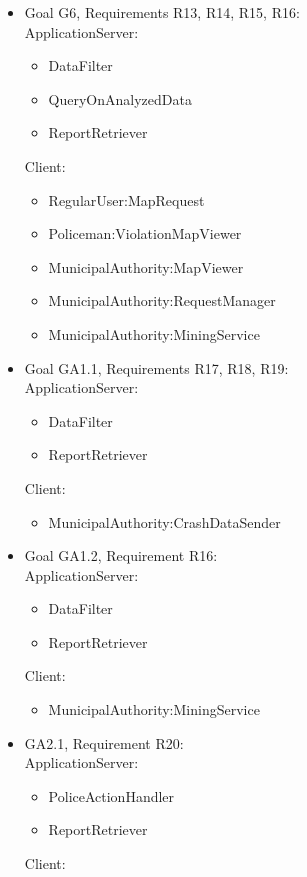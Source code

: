 \begin{itemize}
\begin{itemize}
	\end{itemize}
	\item Goal G6, Requirements R13, R14, R15, R16:\\ApplicationServer:
	\begin{itemize}
		\item DataFilter
		\item QueryOnAnalyzedData
		\item ReportRetriever
	\end{itemize}
	Client:
	\begin{itemize}
		\item RegularUser:MapRequest
		\item Policeman:ViolationMapViewer
		\item MunicipalAuthority:MapViewer
		\item MunicipalAuthority:RequestManager
		\item MunicipalAuthority:MiningService
	\end{itemize}
	\item Goal GA1.1, Requirements R17, R18, R19:\\ApplicationServer:
	\begin{itemize}
		\item DataFilter
		\item ReportRetriever
	\end{itemize}
	Client:
	\begin{itemize}
		\item MunicipalAuthority:CrashDataSender
	\end{itemize}
	\item Goal GA1.2, Requirement R16:\\ApplicationServer:
	\begin{itemize}
		\item DataFilter
		\item ReportRetriever
	\end{itemize}
	Client:
	\begin{itemize}
		\item MunicipalAuthority:MiningService
	\end{itemize}
	\item GA2.1, Requirement R20:\\ApplicationServer:
	\begin{itemize}
		\item PoliceActionHandler
		\item ReportRetriever
	\end{itemize}
	Client:
	\begin{itemize}

\end{itemize}
\end{itemize}
